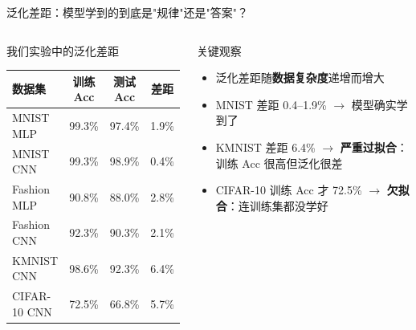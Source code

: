 \documentclass[aspectratio=169]{ctexbeamer}
\begin{document}
\begin{frame}[shrink=25]{泛化差距：模型学到的到底是"规律"还是"答案"？}
\begin{columns}[T]
\begin{block}{我们实验中的泛化差距}
\footnotesize
\centering
\begin{tabular}{l c c c}
\toprule
\textbf{数据集} & \textbf{训练 Acc} & \textbf{测试 Acc} & \textbf{差距} \\
\midrule
MNIST MLP    & 99.3\% & 97.4\% & 1.9\% \\
MNIST CNN    & 99.3\% & 98.9\% & 0.4\% \\
Fashion MLP  & 90.8\% & 88.0\% & 2.8\% \\
Fashion CNN  & 92.3\% & 90.3\% & 2.1\% \\
KMNIST CNN   & 98.6\% & 92.3\% & \alert{6.4\%} \\
CIFAR-10 CNN & 72.5\% & 66.8\% & 5.7\% \\
\bottomrule
\end{tabular}
\end{block}

\vspace{0.05cm}

\begin{exampleblock}{关键观察}
\footnotesize
\begin{itemize}
  \item 泛化差距随\textbf{数据复杂度}递增而增大
  \item MNIST 差距 0.4--1.9\% $\to$ 模型确实学到了
  \item KMNIST 差距 6.4\% $\to$ \textbf{严重过拟合}：训练 Acc 很高但泛化很差
  \item CIFAR-10 训练 Acc 才 72.5\% $\to$ \textbf{欠拟合}：连训练集都没学好
\end{itemize}
\end{exampleblock}
\end{columns}
\end{frame}
\end{document}
